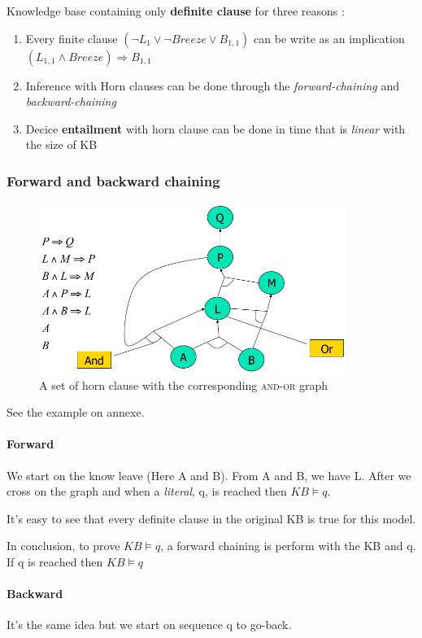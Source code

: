 Knowledge base containing only \textbf{definite clause} for three reasons :
\begin{enumerate}
    \item Every finite clause $(\neg L_1 \vee \neg Breeze \vee B_{1,1})$ can be write as an 
        implication$(L_{1,1} \wedge Breeze) \Rightarrow B_{1,1}$
    \item Inference with Horn clauses can be done through the \textit{forward-chaining} and 
        \textit{backward-chaining}
    \item Decice \textbf{entailment} with horn clause can be done in time
        that is \textit{linear} with the size of KB
\end{enumerate}

\subsubsection{Forward and backward chaining}

\begin{figure}[h]
    \centering
    \includegraphics[width=10cm]{andor.png}
    \caption{A set of horn clause with the corresponding \textsc{and-or} graph}
\end{figure}


See the example on annexe.

\paragraph{Forward}
We start on the know leave (Here A and B). From A and B, we have L. After we cross on the graph 
and when a \textit{literal}, q,  is reached then $KB \models q$.

It's easy to see that every definite clause in the original KB is true
for this model.

In conclusion, to prove $KB \models q$, a forward chaining is perform
with the KB and q. If q is reached then $KB \models q$

\paragraph{Backward}
It's the same idea but we start on sequence q to go-back.


